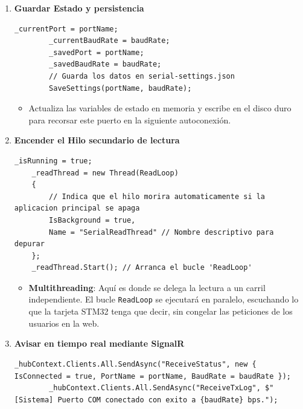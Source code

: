 \documentclass[
10pt, %
a4paper, %
oneside, %
headinclude,footinclude, %
BCOR5mm, %
]{scrartcl}
\begin{document}
\begin{enumerate}
\begin{lstlisting}[style=VSCodeDark]
	// Limpiar buffers para evitar ruido de conexion inicial
	_serialPort.DiscardInBuffer();
	_serialPort.DiscardOutBuffer();
	\end{lstlisting}
	\begin{itemize}
		\item Crea el objeto \texttt{SerialPort} con los parámetros del usuario y define los tiempos límite de espera (timeouts).
		\item \texttt{DiscardInBuffer()} y \texttt{DiscardOutBuffer()}: Limpia toda la "basura" o ruido eléctrico que pueda haber quedado en el cable USB en conexiones anteriores para iniciar con un canal limpio de datos.
	\end{itemize}
	\item \textbf{Guardar Estado y persistencia}
		\begin{lstlisting}[style=VSCodeDark]
		_currentPort = portName;
		_currentBaudRate = baudRate;
		_savedPort = portName;
		_savedBaudRate = baudRate;
		// Guarda los datos en serial-settings.json
		SaveSettings(portName, baudRate); \end{lstlisting}
		\begin{itemize}
			\item Actualiza las variables de estado en memoria y escribe en el disco duro para recorsar este puerto en la siguiente autoconexión.
		\end{itemize}
	\item \textbf{Encender el Hilo secundario de lectura}
	\begin{lstlisting}[style=VSCodeDark]
	_isRunning = true;
	_readThread = new Thread(ReadLoop)
	{
		// Indica que el hilo morira automaticamente si la aplicacion principal se apaga
		IsBackground = true,     
		Name = "SerialReadThread" // Nombre descriptivo para depurar
	};
	_readThread.Start(); // Arranca el bucle 'ReadLoop'\end{lstlisting}
	\begin{itemize}
		\item \textbf{Multithreading}: Aquí es donde se delega la lectura a un carril independiente. El bucle \texttt{ReadLoop} se ejecutará en paralelo, escuchando lo que la tarjeta STM32 tenga que decir, sin congelar las peticiones de los usuarios en la web.
	\end{itemize}
	\item \textbf{Avisar en tiempo real mediante SignalR}
	
		\begin{lstlisting}[style=VSCodeDark]
		_hubContext.Clients.All.SendAsync("ReceiveStatus", new { IsConnected = true, PortName = portName, BaudRate = baudRate });
		_hubContext.Clients.All.SendAsync("ReceiveTxLog", $"[Sistema] Puerto COM conectado con exito a {baudRate} bps.");
		\end{lstlisting}
		

\end{enumerate}
\end{document}
